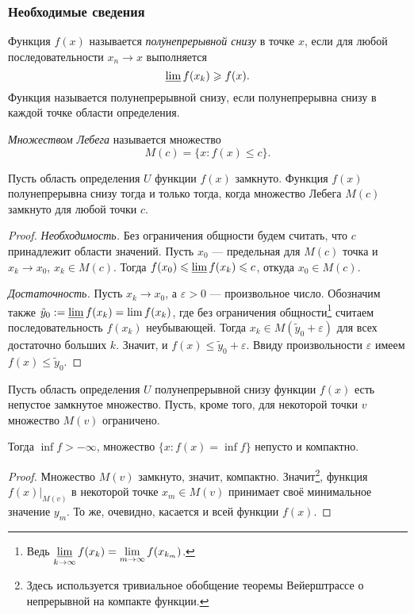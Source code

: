 \subsubsection{Необходимые сведения}
\begin{definition}
  Функция $ f(x) $ называется \emph{полунепрерывной снизу} в точке $ x $, если для любой
  последовательности $ x_n \to x $ выполняется  
  \[
    \varliminf f(x_k) \geqslant f(x).  
  \]
  Функция называется полунепрерывной снизу, если полунепрерывна снизу в каждой
  точке области определения.
\end{definition}
\begin{definition}
  \emph{Множеством Лебега} называется множество 
  \[
    M(c) = \{x\colon f(x) \leqslant c\}.
  \]
\end{definition}
\begin{lemma}
  Пусть область определения $ U $ функции $ f(x) $ замкнуто. Функция $ f(x) $ полунепрерывна снизу тогда и только тогда, когда множество Лебега $
  M(c) $ замкнуто для любой точки $ c $.
\end{lemma}
\begin{proof}
  \textsl{Необходимость.} Без ограничения общности будем считать, что $ c $
  принадлежит области значений. Пусть $ x_0 $ --- предельная для $ M(c) $ точка и $
  x_k \to x_0 $, $ x_k \in M(c) $. Тогда $ f(x_0) \leqslant \varliminf f(x_k)
  \leqslant c $, откуда $ x_0 \in M(c) $.

  \textsl{Достаточность.} Пусть $ x_k \to x_0 $, а $ \varepsilon > 0 $ ---
  произвольное число. Обозначим также $ \tilde y_0 := \varliminf f(x_k) = \lim
  f(x_k) $, где без ограничения
  общности\footnote{Ведь $ \varliminf\limits_{k\to\infty} f(x_k) =
  \lim\limits_{m\to\infty} f(x_{k_m}) $.} считаем последовательность $ f(x_k) $ неубывающей. Тогда $ x_k
  \in M(\tilde y_0 + \varepsilon)$ для всех достаточно больших $ k $. Значит, и
  $ f(x) \leqslant \tilde y_0 + \varepsilon $. Ввиду произвольности $
  \varepsilon $ имеем $ f(x) \leqslant \tilde y_0 $.
\end{proof}

\begin{theorem}
  Пусть область определения $ U $ полунепрерывной снизу функции $ f(x) $ есть
  непустое замкнутое
  множество. Пусть, кроме того, для некоторой точки $ v $ множество $ M(v) $
  ограничено.

  Тогда $ \inf f > -\infty $, множество $ \{x\colon f(x) = \inf f\} $
  непусто и компактно.
\end{theorem}
\begin{proof}
  Множество $ M(v) $ замкнуто, значит, компактно. Значит\footnote{Здесь
    используется тривиальное обобщение теоремы Вейерштрассе о непрерывной на
  компакте функции.}, функция $ f(x)|_{M(v)}
  $ в некоторой точке $ x_m \in M(v) $ принимает своё минимальное значение $ y_m
  $. То же, очевидно, касается и всей функции $ f(x) $.
\end{proof}

